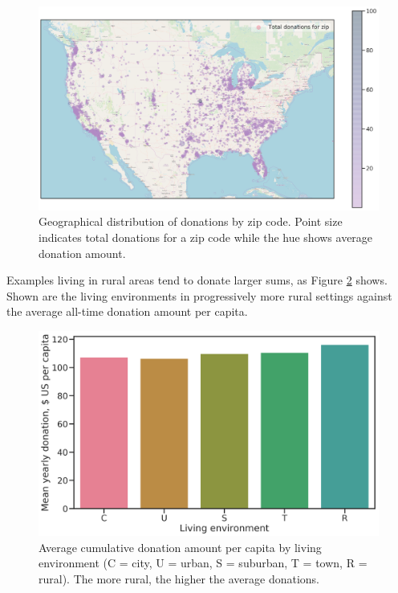 \documentclass[
  11pt,
  a4paper,
  DIV=12,captions=tableheading,oneside,titlepage]{scrbook}
\begin{document}
\begin{figure}

{\centering \includegraphics[width=1\linewidth]{figures/eda/donations-geographical} 

}

\caption{Geographical distribution of donations by zip code. Point size indicates total donations for a zip code while the hue shows average donation amount.}\label{fig:donations-geo}
\end{figure}

Examples living in rural areas tend to donate larger sums, as Figure \ref{fig:donations-le} shows. Shown are the living environments in progressively more rural settings against the average all-time donation amount per capita.



\begin{figure}

{\centering \includegraphics[width=0.7\linewidth]{figures/eda/avg-donations-per-capita-by-living-environment} 

}

\caption{Average cumulative donation amount per capita by living environment (C = city, U = urban, S = suburban, T = town, R = rural). The more rural, the higher the average donations.}\label{fig:donations-le}
\end{figure}
\end{document}
